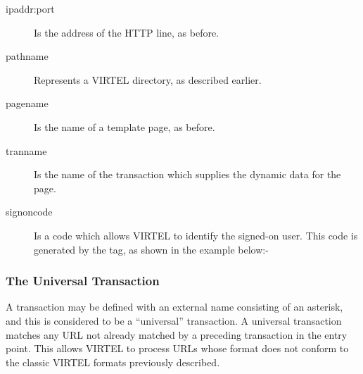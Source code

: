 \documentclass[letterpaper,10pt,english]{sphinxmanual}
\begin{document}
\begin{sphinxVerbatim}[commandchars=\\\{\}]
\end{sphinxVerbatim}
\begin{description}
\item[{ipaddr:port}] \leavevmode
Is the address of the HTTP line, as before.

\item[{pathname}] \leavevmode
Represents a VIRTEL directory, as described earlier.

\item[{pagename}] \leavevmode
Is the name of a template page, as before.

\item[{tranname}] \leavevmode
Is the name of the transaction which supplies the dynamic data for the page.

\item[{signoncode}] \leavevmode
Is a code which allows VIRTEL to identify the signed-on user. This code is generated by the  tag, as shown in the example below:-

\end{description}

\begin{sphinxVerbatim}[commandchars=\\\{\}]
\end{sphinxVerbatim}


\subsubsection{The Universal Transaction}
\label{\detokenize{User_Guide:the-universal-transaction}}
A transaction may be defined with an external name consisting of an asterisk, and this is considered to be a “universal” transaction. A universal transaction matches any URL not already matched by a preceding transaction in the entry point. This allows VIRTEL to process URLs whose format does not conform to the classic VIRTEL formats previously described.
\end{document}
